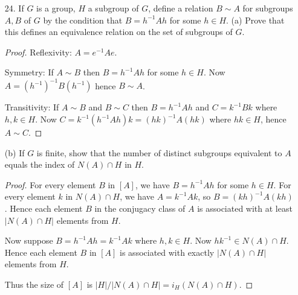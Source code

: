 \begin{itemize}
\begin{proof}
	Symmetry: If $a \sim b$, then $b = h^{-1} ah $ for some $h \in H$. Hence $a = (h^{-1} )^{-1} b h^{-1} $ where $h^{-1}  \in H$. Hence $b \sim a$.

	Transitivity: If $a\sim b$ and $b\sim c$, then $b = h^{-1} ah $ and $c = k^{-1} b k$ for $h, k \in H$. Then $c = k^{-1} (h^{-1} ah) k = (hk)^{-1} a (hk)$ where $hk \in H$, so $a\sim c$
\end{proof}

(b) If $[a]$ is the equivalence class of $a$, show that if $G$ is a finite group, then $[a]$ has $m$ elements where $m$ is the index of $H \cap C(a)$ in $H$.
\begin{proof}
	Let $b \in [a]$, so $b = h_1^{-1} a h_1$ for some $h_1 \in H$.
	For each $h \in C(a) \cap H$, we also have $b = (h_1^{-1} h^{-1} ) a (h h_1)$, so $b$ can be expressed as conjugation by at least $|C(a) \cap H|$ different items on $a$. On the other hand, if $b = h_1^{-1} a h_1 = h_2^{-1} a h_2$ where $h_1, h_2 \in H$, then we have $h_1h_2^{-1} \in C(a) \cap H$, so each item $b$ can be obtained by conjugating on $a$ exactly $|C(a) \cap H|$ items in $H$.

	Therefore the number of different conjugates is \[
		|[a]| = m = |H| / |C(a) \cap H| = i_H\left( H \cap C(a) \right) 
	.\] 
\end{proof}

	\item [24.] If $G$ is a group, $H$ a subgroup of $G$, define a relation $B \sim A$ for subgroups $A, B$ of $G$ by the condition that $B=h^{-1} A h$ for some $h \in H$.
(a) Prove that this defines an equivalence relation on the set of subgroups of $G$.
\begin{proof}
	Reflexivity: $A = e^{-1} A e$.

	Symmetry: If $A \sim B$ then $B = h^{-1} Ah$ for some $h \in H$. Now $A = (h^{-1} )^{-1} B (h^{-1} )$ hence $B \sim A$.

	Transitivity: If $A\sim B$ and $B \sim C$ then $B = h^{-1} A h$ and $C = k^{-1} Bk$ where $h, k \in H$. Now $C = k^{-1} (h^{-1} A h) k = (hk)^{-1} A (hk)$ where $hk \in H$, hence $A \sim C$.
\end{proof}

(b) If $G$ is finite, show that the number of distinct subgroups equivalent to $A$ equals the index of $N(A) \cap H$ in $H$.
\begin{proof}
	For every element $B$ in $[A ]$, we have $B = h^{-1} A h$ for some $h \in H$. For every element $k$ in $N(A) \cap H$, we have $A = k^{-1} A k$, so $B = (kh)^{-1} A (kh)$. Hence each element $B$ in the conjugacy class of $A$ is associated with at least $|N(A) \cap H|$ elements from $H$.

	Now suppose $B = h^{-1} A h = k^{-1} A k$ where $h, k \in H$. Now $hk^{-1} \in N(A) \cap H$. Hence each element $B$ in $[A]$ is associated with exactly $|N(A) \cap H|$ elements from $H$.

	Thus the size of  $[A]$ is $|H| / |N(A) \cap H|  = i_H\left( N(A) \cap H \right) $.
\end{proof}

\end{itemize}
